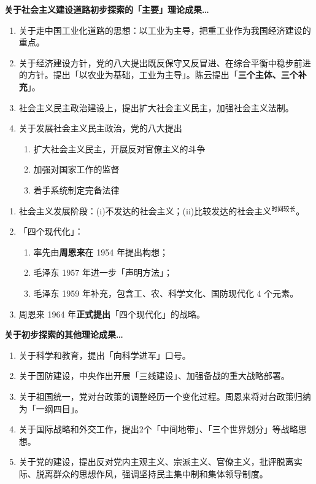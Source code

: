 \documentclass[UTF8]{ctexart}
\newcommand\Emph[2]{\colorbox{c#1-light}{\textcolor{c#1-emph}{\textbf{#2}}}}
\begin{document}
\begin{mybox}{4}
\textbf{关于社会主义建设道路初步探索的「主要」理论成果…}
\begin{enumerate}[start=7]
  \item 关于走中国工业化道路的思想：以工业为主导，把重工业作为我国经济建设的重点。
  \item 关于经济建设方针，党的八大提出既反保守又反冒进、在综合平衡中稳步前进的方针。提出「以农业为基础，工业为主导」。陈云提出「\Emph{4}{三个主体、三个补充}」。
  \item 社会主义民主政治建设上，提出扩大社会主义民主，加强社会主义法制。
  \item 关于发展社会主义民主政治，党的八大提出
  \begin{enumerate}[label={\roman{enumii})}, start=1]
    \item 扩大社会主义民主，开展反对官僚主义的斗争
    \item 加强对国家工作的监督
    \item 着手系统制定完备法律
  \end{enumerate}
\end{enumerate}
\end{mybox}

\begin{enumerate}[start=11]
  \item 社会主义发展阶段：(i)不发达的社会主义；(ii)比较发达的社会主义$^{\text{时间较长}}$。
  \item 「四个现代化」：
  \begin{enumerate}[label={\roman{enumii})}, start=1]
    \item 率先由\Emph{4}{周恩来}在 1954 年提出构想；
    \item 毛泽东 1957 年进一步「声明方法」；
    \item 毛泽东 1959 年补充，包含工、农、科学文化、国防现代化 4 个元素。
  \end{enumerate}
  \item 周恩来 1964 年\Emph{4}{正式提出}「四个现代化」的战略。
\end{enumerate}

\begin{mybox}{4}
\textbf{关于初步探索的其他理论成果…}
\begin{enumerate}
    \item 关于科学和教育，提出「向科学进军」口号。
    \item 关于国防建设，中央作出开展「三线建设」、加强备战的重大战略部署。
    \item 关于祖国统一，党对台政策的调整经历一个变化过程。周恩来将对台政策归纳为「一纲四目」。
    \item 关于国际战略和外交工作，提出2个「中间地带」、「三个世界划分」等战略思想。
    \item 关于党的建设，提出反对党内主观主义、宗派主义、官僚主义，批评脱离实际、脱离群众的思想作风，强调坚持民主集中制和集体领导制度。
\end{enumerate}
\end{mybox}
\end{document}

